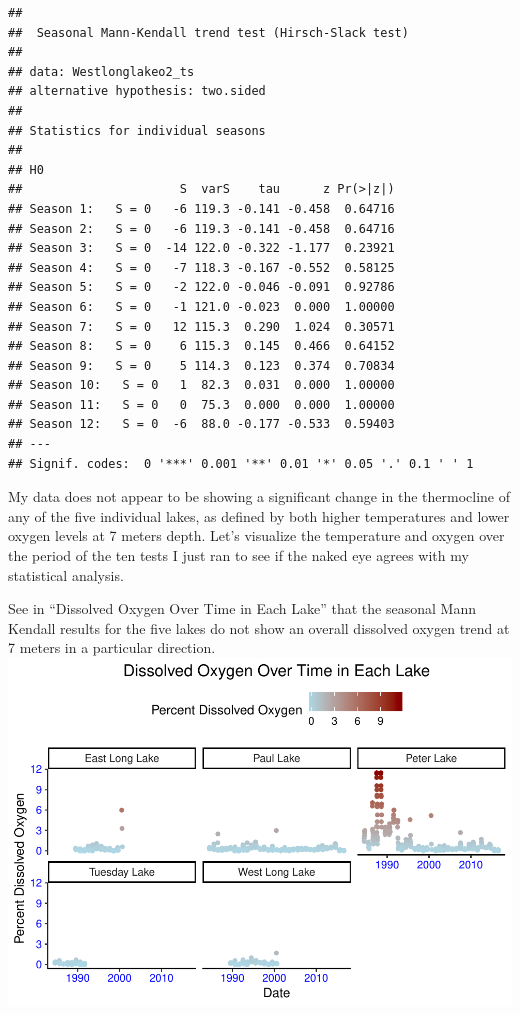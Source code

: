 \documentclass[12pt,]{article}
\begin{document}
\begin{verbatim}
## 
##  Seasonal Mann-Kendall trend test (Hirsch-Slack test)
## 
## data: Westlonglakeo2_ts
## alternative hypothesis: two.sided
## 
## Statistics for individual seasons
## 
## H0
##                      S  varS    tau      z Pr(>|z|)  
## Season 1:   S = 0   -6 119.3 -0.141 -0.458  0.64716  
## Season 2:   S = 0   -6 119.3 -0.141 -0.458  0.64716  
## Season 3:   S = 0  -14 122.0 -0.322 -1.177  0.23921  
## Season 4:   S = 0   -7 118.3 -0.167 -0.552  0.58125  
## Season 5:   S = 0   -2 122.0 -0.046 -0.091  0.92786  
## Season 6:   S = 0   -1 121.0 -0.023  0.000  1.00000  
## Season 7:   S = 0   12 115.3  0.290  1.024  0.30571  
## Season 8:   S = 0    6 115.3  0.145  0.466  0.64152  
## Season 9:   S = 0    5 114.3  0.123  0.374  0.70834  
## Season 10:   S = 0   1  82.3  0.031  0.000  1.00000  
## Season 11:   S = 0   0  75.3  0.000  0.000  1.00000  
## Season 12:   S = 0  -6  88.0 -0.177 -0.533  0.59403  
## ---
## Signif. codes:  0 '***' 0.001 '**' 0.01 '*' 0.05 '.' 0.1 ' ' 1
\end{verbatim}

My data does not appear to be showing a significant change in the
thermocline of any of the five individual lakes, as defined by both
higher temperatures and lower oxygen levels at 7 meters depth. Let's
visualize the temperature and oxygen over the period of the ten tests I
just ran to see if the naked eye agrees with my statistical analysis.

See in ``Dissolved Oxygen Over Time in Each Lake'' that the seasonal
Mann Kendall results for the five lakes do not show an overall dissolved
oxygen trend at 7 meters in a particular direction.
\includegraphics{Bollt_ENV872_FinalProject_files/figure-latex/smk oxygen visualization-1.pdf}
\end{document}
